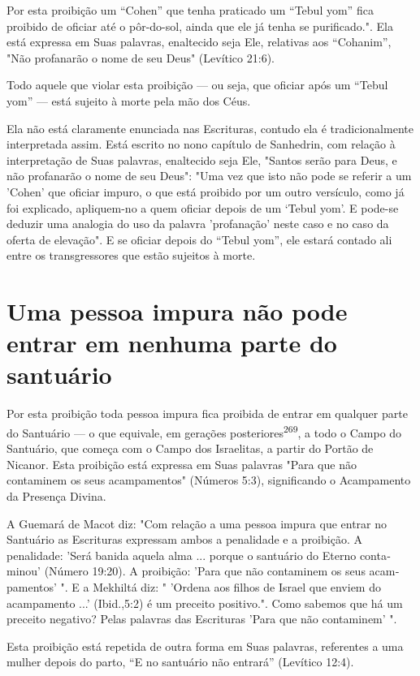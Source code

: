 Por esta proibição um ``Cohen'' que tenha praticado um ``Tebul yom'' fica
proibido de oficiar até o pôr-do-sol, ainda que ele já tenha se
purificado.". Ela está expressa em Suas palavras,
enaltecido seja Ele, relativas aos ``Cohanim'', "Não profanarão o nome de
seu Deus" (Levítico 21:6).

Todo aquele que violar esta proibição --- ou seja, que oficiar após um
``Tebul yom'' --- está sujeito à morte pela mão dos Céus.

Ela não está claramente enunciada nas Escrituras, contudo ela é
tra­dicionalmente interpretada assim. Está escrito no nono capítulo de
Sanhedrin, com relação à interpretação de Suas palavras, enaltecido seja
Ele, "Santos serão
para Deus, e não profanarão o nome de seu Deus": "Uma vez que isto não
po­de se referir a um 'Cohen' que oficiar impuro, o que está proibido
por um ou­tro versículo, como já foi explicado, apliquem-no a quem
oficiar depois de um `Tebul yom'. E pode-se deduzir uma analogia do uso
da palavra 'profanação' neste caso e no caso da oferta de elevação". E
se oficiar depois do ``Tebul yom'', ele estará contado ali entre os
transgressores que estão sujeitos à morte.


\section{Uma pessoa impura não pode entrar em nenhuma parte do santuário}


Por esta proibição toda pessoa impura fica proibida de entrar em
qual­quer parte do Santuário --- o que equivale, em gerações
posteriores\textsuperscript{269}, a todo o Campo do Santuário, que
começa com o Campo dos Israelitas, a partir do Portão de Nicanor. Esta
proibição está expressa em Suas palavras "Para que não contaminem os
seus acampamentos" (Números 5:3), significando o Acampa­mento da
Presença Divina.

A Guemará de Macot diz: "Com relação a uma pessoa impura que entrar no
Santuário as Escrituras expressam ambos a penalidade e a proibição. A
penalidade: 'Será banida aquela alma ... porque o santuário do Eterno
conta­minou' (Número 19:20). A proibição: 'Para que não contaminem os
seus acam­pamentos' ". E a Mekhiltá diz: " 'Ordena aos filhos de Israel
que enviem do acampamento ...' (Ibid.,5:2) é um preceito
positivo.". Como sabemos que há um preceito negativo?
Pelas palavras das Escrituras 'Para que não contaminem' ".

Esta proibição está repetida de outra forma em Suas palavras,
refe­rentes a uma mulher depois do parto, ``E no santuário não entrará''
(Levítico 12:4).

